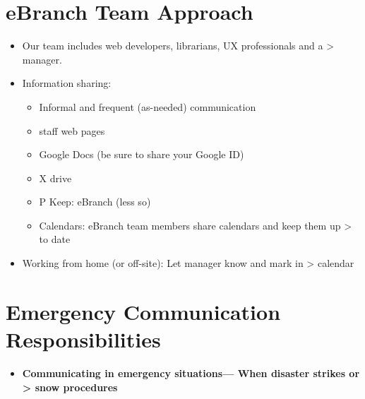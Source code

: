 \documentclass[
  openany]{book}
\providecommand{\tightlist}{%
  \setlength{\itemsep}{0pt}\setlength{\parskip}{0pt}}
\begin{document}
\hypertarget{ebranch-team-approach}{%
\section{eBranch Team Approach}\label{ebranch-team-approach}}

\begin{itemize}
\item
  Our team includes web developers, librarians, UX professionals and a
  \textgreater{} manager.
\item
  Information sharing:

  \begin{itemize}
  \item
    Informal and frequent (as-needed) communication
  \item
    staff web pages
  \item
    Google Docs (be sure to share your Google ID)
  \item
    X drive
  \item
    P Keep: eBranch (less so)
  \item
    Calendars: eBranch team members share calendars and keep them up
    \textgreater{} to date
  \end{itemize}
\item
  Working from home (or off-site): Let manager know and mark in
  \textgreater{} calendar
\end{itemize}

\hypertarget{emergency-communication-responsibilities}{%
\section{Emergency Communication Responsibilities}\label{emergency-communication-responsibilities}}

\begin{itemize}
\tightlist
\item
  \textbf{Communicating in emergency situations--- When disaster strikes or
  \textgreater{} snow procedures}
\end{itemize}
\end{document}
